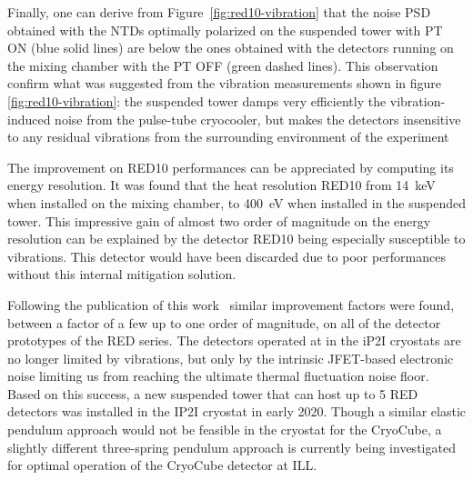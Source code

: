 Finally, one can derive from Figure~\ref{fig:red10-vibration} that the noise PSD obtained with the NTDs optimally polarized on the suspended tower with PT ON (blue solid lines) are below the ones obtained with the detectors running on the mixing chamber with the PT OFF (green dashed lines). This observation confirm what was suggested from the vibration measurements shown in figure \ref{fig:red10-vibration}:  the suspended tower damps very efficiently the vibration-induced noise from the pulse-tube cryocooler, but makes the detectors insensitive to any residual vibrations from the surrounding environment of the experiment

The improvement on RED10 performances can be appreciated by computing its energy resolution. It was found that the heat resolution RED10 from \SI{14}{\kilo\eV} when installed on the mixing chamber, to \SI{400}{\eV}  when installed in the suspended tower. This impressive gain of almost two order of magnitude on the energy resolution can be explained by the detector RED10 being especially susceptible to vibrations. This detector would have been discarded due to poor performances without this internal mitigation solution.


Following the publication of this work~\cite{Maisonobe:2018tbq} similar improvement factors were found, between a factor of a few up to one order of magnitude, on all of the detector prototypes of the RED series.
The detectors operated at in the iP2I cryostats are no longer limited by vibrations, but only by the intrinsic JFET-based electronic noise limiting us from reaching the ultimate thermal fluctuation noise floor.
Based on this success, a new suspended tower
that can host up to 5 RED detectors was installed in the IP2I cryostat in early 2020.  Though a similar elastic pendulum approach would not be feasible in the \Ricochet{} cryostat for the CryoCube, a slightly different three-spring pendulum approach is currently being investigated  for optimal operation of the CryoCube detector  at ILL.

